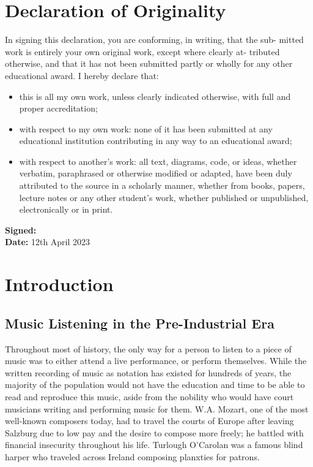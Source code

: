 \documentclass[a4paper, 12pt]{report}
\begin{document}
\chapter*{Declaration of Originality}
In signing this declaration, you are conforming, in writing, that the sub-
mitted work is entirely your own original work, except where clearly at-
tributed otherwise, and that it has not been submitted partly or wholly for
any other educational award.
I hereby declare that:
\begin{itemize}
    \item this is all my own work, unless clearly indicated otherwise, with full and proper accreditation;
    \item with respect to my own work: none of it has been submitted at any educational institution contributing in any way to an educational award;
    \item with respect to another's work: all text, diagrams, code, or ideas, whether verbatim, paraphrased or otherwise modified or adapted, have been duly attributed to the source in a scholarly manner, whether from books, papers, lecture notes or any other student's work, whether published or unpublished, electronically or in print.
\end{itemize}
\large{\textbf{Signed:}}  \\
\large{\textbf{Date:}} 12th April 2023

\tableofcontents


\chapter{Introduction}

\section{Music Listening in the Pre-Industrial Era}
Throughout most of history, the only way for a person to listen to a piece of music was to either attend a live performance,
or perform themselves. While the written recording of music as notation has existed for hundreds of years, the majority of the population 
would not have the education and time to be able to read and reproduce this music, aside from the nobility who would have 
court musicians writing and performing music for them. W.A. Mozart, one of the most well-known composers today, had to travel the courts of Europe 
after leaving Salzburg due to low pay and the desire to compose more freely; he battled with financial insecurity throughout his life.
Turlough O'Carolan was a famous blind harper who traveled across Ireland composing planxties for patrons.
\end{document}
